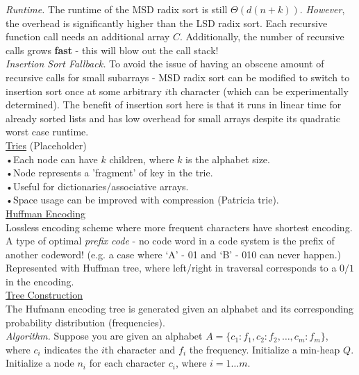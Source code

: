 \documentclass[12pt, fleqn]{general}
\begin{document}
\begin{multicols*}{2}
    \emph{Runtime.} The runtime of the MSD radix sort is still $\Theta(d(n+k))$. \emph{However}, the overhead is significantly higher than the LSD radix sort. Each recursive function call needs an additional array $C$. Additionally, the number of recursive calls grows \textbf{fast} - this will blow out the call stack!\\

    \emph{Insertion Sort Fallback.} To avoid the issue of having an obscene amount of recursive calls for small subarrays - MSD radix sort can be modified to switch to insertion sort once at some arbitrary $i$th character (which can be experimentally determined). The benefit of insertion sort here is that it runs in linear time for already sorted lists and has low overhead for small arrays despite its quadratic worst case runtime.\\
    

    {\large \underline{Tries} (Placeholder)}\\

    •Each node can have $k$ children, where $k$ is the alphabet size.\\
    •Node represents a 'fragment' of key in the trie.\\
    •Useful for dictionaries/associative arrays.\\
    •Space usage can be improved with compression (Patricia trie).\\

    {\large \underline{Huffman Encoding}}\\

    Lossless encoding scheme where more frequent characters have shortest encoding. A type of optimal \emph{prefix code} - no code word in a code system is the prefix of another codeword! (e.g. a case where `A' - 01 and `B' - 010 can never happen.)\\

    Represented with Huffman tree, where left/right in traversal corresponds to a $0/1$ in the encoding.\\

    \underline{Tree Construction}\\
    
    The Hufmann encoding tree is generated given an alphabet and its corresponding probability distribution (frequencies).\\

    \emph{Algorithm.} Suppose you are given an alphabet $A = \{c_1 : f_1, c_2 : f_2, \dots, c_m : f_m\}$, where $c_i$ indicates the $i$th character and $f_i$ the frequency. Initialize a min-heap $Q$. Initialize a node $n_i$ for each character $c_i$, where $i = 1\dots m$.\\
    

\end{multicols*}
\end{document}
